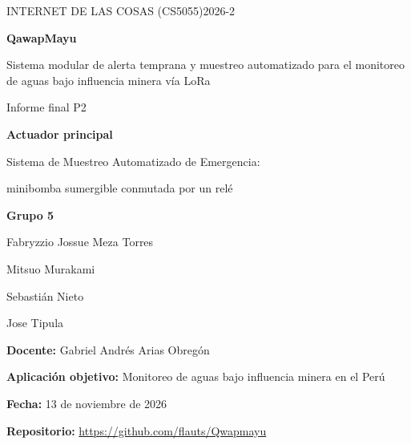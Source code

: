 \documentclass[11pt,a4paper]{article}
\begin{document}
\hypersetup{pageanchor=false}
\begin{titlepage}

\color{navy}

{\large INTERNET DE LAS COSAS (CS5055)\hfill 2026-2}\par

\vspace{1.8cm}

{\Huge\bfseries QawapMayu\par}

\vspace{0.5cm}

{\LARGE
Sistema modular de alerta temprana y muestreo automatizado para el monitoreo de aguas bajo influencia minera vía LoRa
\par}

\vspace{0.8cm}

{\Large Informe final P2\par}

\vspace{0.8cm}

\colorbox{pale}{
    \parbox{0.92\textwidth}{
        \vspace{4mm}

        \textbf{Actuador principal}\par
        Sistema de Muestreo Automatizado de Emergencia:\par
        minibomba sumergible conmutada por un relé

        \vspace{4mm}
    }
}

\vfill

\textbf{Grupo 5}\par
Fabryzzio Jossue Meza Torres\par
Mitsuo Murakami\par
Sebastián Nieto\par
Jose Tipula\par

\vspace{0.4cm}

\textbf{Docente:} Gabriel Andrés Arias Obregón\par
\textbf{Aplicación objetivo:} Monitoreo de aguas bajo influencia minera en el Perú\par
\textbf{Fecha:} 13 de noviembre de 2026\par
\textbf{Repositorio:} \url{https://github.com/flauts/Qwapmayu}\par

\end{titlepage}
\hypersetup{pageanchor=true}
\end{document}
